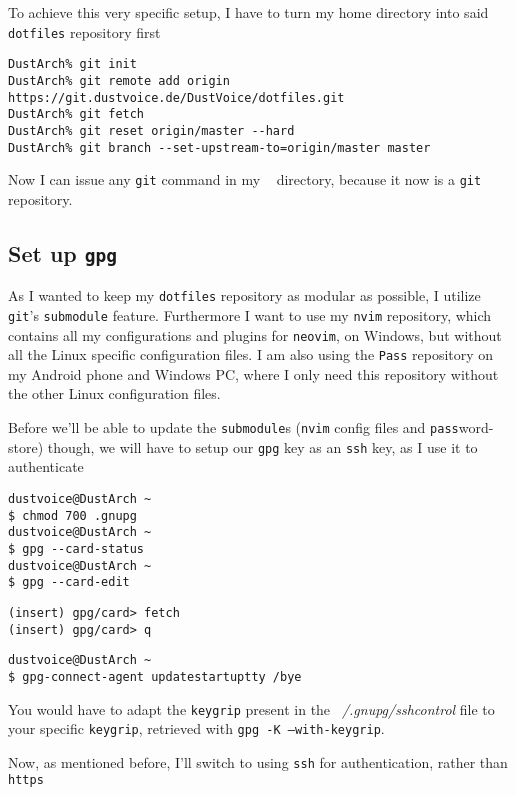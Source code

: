 \documentclass[9pt]{report}
\newenvironment{NOTE}
{\begin{tcolorbox}[colback=admonitionBG,coltitle=draculaFG,colframe=draculaBlue,colbacktitle=draculaBlue,title=NOTE]}
{\end{tcolorbox}}
\begin{document}
To achieve this very specific setup, I have to turn my home directory into said \texttt{dotfiles} repository first


\begin{verbatim}
DustArch% git init
DustArch% git remote add origin https://git.dustvoice.de/DustVoice/dotfiles.git
DustArch% git fetch
DustArch% git reset origin/master --hard
DustArch% git branch --set-upstream-to=origin/master master
\end{verbatim}

Now I can issue any \texttt{git} command in my \textit{~} directory, because it now is a \texttt{git} repository.



\newpage

\hypertarget{x-set-up-gpg}{\subsection{Set up \texttt{gpg}}}
As I wanted to keep my \texttt{dotfiles} repository as modular as possible, I utilize \texttt{git}'s \texttt{submodule} feature.
Furthermore I want to use my \texttt{nvim} repository, which contains all my configurations and plugins for \texttt{neovim}, on Windows, but without all the Linux specific configuration files.
I am also using the \texttt{Pass} repository on my Android phone and Windows PC, where I only need this repository without the other Linux configuration files.


Before we’ll be able to update the \texttt{submodule}s (\texttt{nvim} config files and \texttt{pass}word-store) though, we will have to setup our \texttt{gpg} key as an \texttt{ssh} key, as I use it to authenticate


\begin{verbatim}
dustvoice@DustArch ~
$ chmod 700 .gnupg
dustvoice@DustArch ~
$ gpg --card-status
dustvoice@DustArch ~
$ gpg --card-edit
\end{verbatim}

\begin{verbatim}
(insert) gpg/card> fetch
(insert) gpg/card> q
\end{verbatim}

\begin{verbatim}
dustvoice@DustArch ~
$ gpg-connect-agent updatestartuptty /bye
\end{verbatim}

\begin{NOTE}
    You would have to adapt the \texttt{keygrip} present in the \textit{~/.gnupg/sshcontrol} file to your specific \texttt{keygrip}, retrieved with \texttt{gpg -K --with-keygrip}.

\end{NOTE}
Now, as mentioned before, I’ll switch to using \texttt{ssh} for authentication, rather than \texttt{https}
\end{document}
